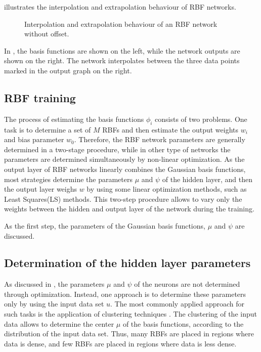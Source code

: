  illustrates the interpolation and extrapolation behaviour of RBF networks. 

\begin{figure}[H]
\centering
 
\caption{Interpolation and extrapolation behaviour of an RBF network without offset.}
\label{fig:rbf_interpol}
\end{figure}

\vspace{-3mm}

In , the basis functions are shown on the left, while the network outputs are shown on the right. The network interpolates  between the three data points marked in the output graph on the right. 

\subsection{RBF training}
\label{RBF_training}

The process of estimating the basis functions $\phi_i$ consists of two problems. One task is to determine a set of $M$ RBFs and then estimate the output weights $w_i$ and bias parameter $w_0$. Therefore, the RBF network parameters are generally determined in a two-stage procedure, while in other type of networks the parameters are determined simultaneously by non-linear optimization\cite{RBF_article}. As the output layer of RBF networks linearly combines the Gaussian basis functions, most strategies determine the parameters $\mu$ and $\psi$ of the hidden layer, and then the output layer weighs $w$ by using some linear optimization methods, such as Least Squares(LS) methods. This two-step procedure allows to vary only the weights between the hidden and output layer of the network during the training. 

As the first step, the parameters of the Gaussian basis functions, $\mu$ and $\psi$ are discussed. 

\subsection{Determination of the hidden layer parameters}
\label{determination_hidden_layer}

As discussed in , the parameters $\mu$ and $\psi$ of the neurons are not determined through optimization. Instead, one approach is to determine these parameters only by using the input data set $u$. The most commonly applied approach for such tasks is the application of clustering techniques \cite{nelles2013nonlinear}. The clustering of the input data allows to determine the center $\mu$ of the basis functions, according to the distribution of the input data set. Thus, many RBFs are placed in regions where data is dense, and few RBFs are placed in regions where data is less dense.  


